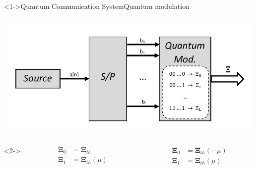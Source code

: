 \begin{frame}<1->{Quantum Communication System}{Quantum modulation}
    \begin{center}
        \includegraphics[width=0.85\linewidth]{Pictures/fig2.1.pdf}
    \end{center}
    \begin{columns}<2->
        \begin{column}{0.5\linewidth}
            \begin{equation*}\begin{split}
                \pmb{\Xi}_0 &= \pmb{\Xi}_{th}\\
                \pmb{\Xi}_1 &= \pmb{\Xi}_{th}(\mu)
            \end{split}\end{equation*}
        \end{column}
        \begin{column}{0.5\linewidth}
            \begin{equation*}\begin{split}
                \pmb{\Xi}_0 &= \pmb{\Xi}_{th}(-\mu)\\
                \pmb{\Xi}_1 &= \pmb{\Xi}_{th}(\mu)
            \end{split}\end{equation*}
        \end{column}
    \end{columns}
    \ \\ \mbox{}\\ \mbox{}\\ \mbox{}
\end{frame}